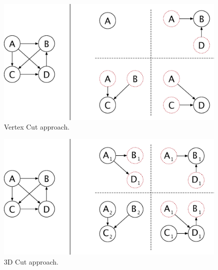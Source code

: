 \begin{figure}
  \center
  \includegraphics[width=.8\linewidth]{figures/vertexcut}
  \caption{Vertex Cut approach.}
  \label{fig:vertexcut}
\end{figure}

\begin{figure}
  \center
  \includegraphics[width=.8\linewidth]{figures/3dcut}
  \caption{3D Cut approach.}
  \label{fig:3dcut}
\end{figure}

